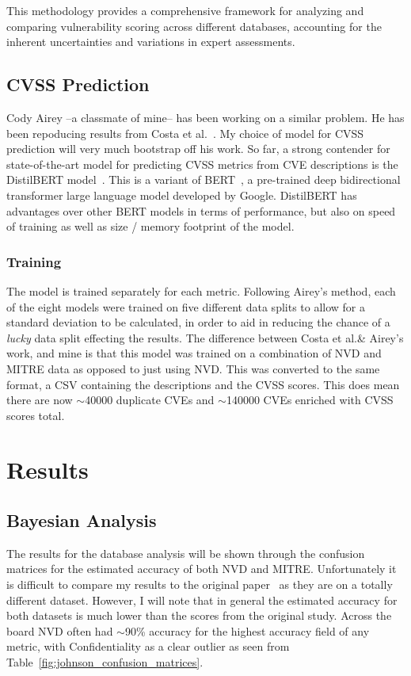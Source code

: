 \documentclass[12pt]{article}
\begin{document}
This methodology provides a comprehensive framework for analyzing and comparing vulnerability
scoring across different databases, accounting for the inherent uncertainties and variations in
expert assessments.


\subsection{CVSS Prediction} \label{cvss_prediction}

Cody Airey --a classmate of mine-- has been working on a similar problem. He has been repoducing
results from Costa et al.\@~\cite{costa}. My choice of model for CVSS prediction will very much
bootstrap off his work. So far, a strong contender for state-of-the-art model for predicting CVSS
metrics from CVE descriptions is the DistilBERT model~\cite{distilbert}. This is a variant of
BERT~\cite{BERT}, a pre-trained deep bidirectional transformer large language model developed by
Google. DistilBERT has advantages over other BERT models in terms of performance, but also on speed
of training as well as size / memory footprint of the model.

\subsubsection{Training}

The model is trained separately for each metric. Following Airey's method, each of the eight models
were trained on five different data splits to allow for a standard deviation to be calculated, in
order to aid in reducing the chance of a \textit{lucky} data split effecting the results. The
difference between Costa et al.\@ \& Airey's work, and mine is that this model was trained on a
combination of NVD and MITRE data as opposed to just using NVD. This was converted to the same
format, a CSV containing the descriptions and the CVSS scores. This does mean there are now
$\sim$40000 duplicate CVEs and $\sim$140000 CVEs enriched with CVSS scores total.

\section{Results}

\subsection{Bayesian Analysis}

The results for the database analysis will be shown through the confusion matrices for the estimated
accuracy of both NVD and MITRE. Unfortunately it is difficult to compare my results to the original
paper~\cite{bayes} as they are on a totally different dataset. However, I will note that in general the estimated
accuracy for both datasets is much lower than the scores from the original study. Across the board NVD
often had $\sim$90\% accuracy for the highest accuracy field of any metric, with Confidentiality as
a clear outlier as seen from Table~\ref{fig:johnson_confusion_matrices}.
\end{document}
